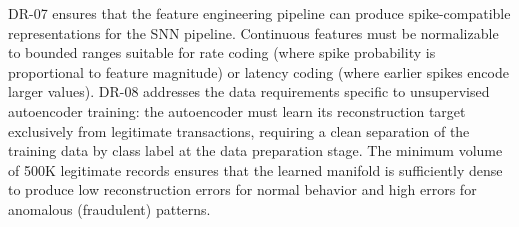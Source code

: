 DR-07 ensures that the feature engineering pipeline can produce spike-compatible representations for the SNN pipeline. Continuous features must be normalizable to bounded ranges suitable for rate coding (where spike probability is proportional to feature magnitude) or latency coding (where earlier spikes encode larger values). DR-08 addresses the data requirements specific to unsupervised autoencoder training: the autoencoder must learn its reconstruction target exclusively from legitimate transactions, requiring a clean separation of the training data by class label at the data preparation stage. The minimum volume of 500K legitimate records ensures that the learned manifold is sufficiently dense to produce low reconstruction errors for normal behavior and high errors for anomalous (fraudulent) patterns.

